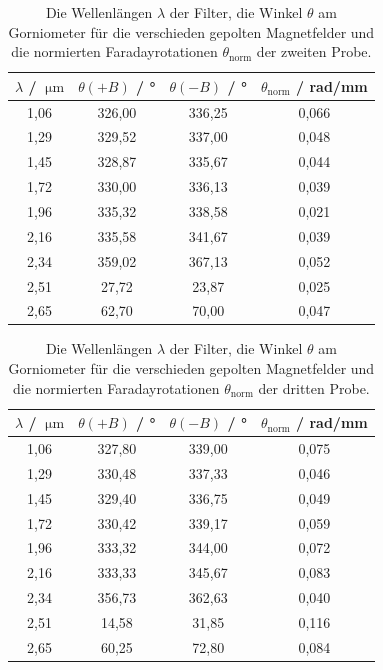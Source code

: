 \begin{table}
  \centering
  \begin{tabular}{c c c c}
    \toprule
    $\lambda$ / $\SI{}{\micro\metre}$ & $\theta(+B)$ / ° & $\theta(-B)$ / ° & $\theta_{\mathrm{norm}}$ / rad/mm\\
    \midrule
        1,06  & 326,00 & 336,25 & 0,066  \\
        1,29  & 329,52 & 337,00 & 0,048  \\
        1,45  & 328,87 & 335,67 & 0,044  \\
        1,72  & 330,00 & 336,13 & 0,039  \\
        1,96  & 335,32 & 338,58 & 0,021  \\
        2,16  & 335,58 & 341,67 & 0,039  \\
        2,34  & 359,02 & 367,13 & 0,052  \\
        2,51  &  27,72 &  23,87 & 0,025  \\
        2,65  &  62,70 &  70,00 & 0,047  \\
    \bottomrule
  \end{tabular}
  \caption{Die Wellenlängen $\lambda$ der Filter, die Winkel $\theta$ am Gorniometer für die verschieden gepolten Magnetfelder und die
  normierten Faradayrotationen $\theta_{\mathrm{norm}}$ der zweiten Probe.}
  \label{tab:theta2}
\end{table}


\begin{table}
  \centering
  \begin{tabular}{c c c c}
    \toprule
    $\lambda$ / $\SI{}{\micro\metre}$ & $\theta(+B)$ / ° & $\theta(-B)$ / ° & $\theta_{\mathrm{norm}}$ / rad/mm\\
    \midrule
        1,06  & 327,80 & 339,00 & 0,075\\  
        1,29  & 330,48 & 337,33 & 0,046\\  
        1,45  & 329,40 & 336,75 & 0,049\\  
        1,72  & 330,42 & 339,17 & 0,059\\  
        1,96  & 333,32 & 344,00 & 0,072\\  
        2,16  & 333,33 & 345,67 & 0,083\\  
        2,34  & 356,73 & 362,63 & 0,040\\  
        2,51  & 14,58  & 31,85  & 0,116\\  
        2,65  & 60,25  & 72,80  & 0,084\\  
    \bottomrule
  \end{tabular}
  \caption{Die Wellenlängen $\lambda$ der Filter, die Winkel $\theta$ am Gorniometer für die verschieden gepolten Magnetfelder und die
  normierten Faradayrotationen $\theta_{\mathrm{norm}}$ der dritten Probe.}
  \label{tab:theta3}
\end{table}

